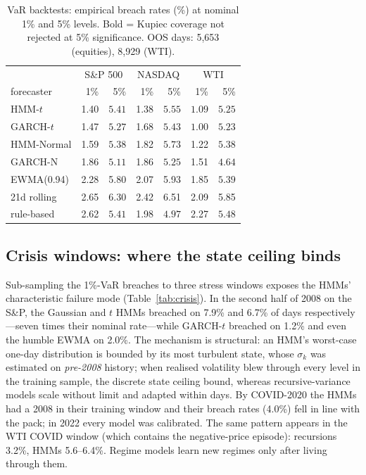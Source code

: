 \documentclass[11pt]{article}
\begin{document}
\begin{table}[t]
\centering
\caption{VaR backtests: empirical breach rates (\%) at nominal 1\% and 5\%
levels. Bold = Kupiec coverage not rejected at 5\% significance.
OOS days: 5{,}653 (equities), 8{,}929 (WTI).}
\label{tab:var}
\begin{tabular}{lrrrrrr}
\toprule
& \multicolumn{2}{c}{S\&P 500} & \multicolumn{2}{c}{NASDAQ}
& \multicolumn{2}{c}{WTI} \\
forecaster & 1\% & 5\% & 1\% & 5\% & 1\% & 5\% \\
\midrule
HMM-$t$     & 1.40 & $\mathbf{5.41}$ & 1.38 & $\mathbf{5.55}$ & $\mathbf{1.09}$ & $\mathbf{5.25}$ \\
GARCH-$t$   & 1.47 & $\mathbf{5.27}$ & 1.68 & $\mathbf{5.43}$ & $\mathbf{1.00}$ & $\mathbf{5.23}$ \\
HMM-Normal  & 1.59 & $\mathbf{5.38}$ & 1.82 & $\mathbf{5.73}$ & 1.22 & $\mathbf{5.38}$ \\
GARCH-N     & 1.86 & $\mathbf{5.11}$ & 1.86 & $\mathbf{5.25}$ & 1.51 & $\mathbf{4.64}$ \\
EWMA(0.94)  & 2.28 & 5.80 & 2.07 & 5.93 & 1.85 & $\mathbf{5.39}$ \\
21d rolling & 2.65 & 6.30 & 2.42 & 6.51 & 2.09 & 5.85 \\
rule-based  & 2.62 & $\mathbf{5.41}$ & 1.98 & $\mathbf{4.97}$ & 2.27 & $\mathbf{5.48}$ \\
\bottomrule
\end{tabular}
\end{table}

\subsection{Crisis windows: where the state ceiling binds}
Sub-sampling the 1\%-VaR breaches to three stress windows exposes the
HMMs' characteristic failure mode (Table~\ref{tab:crisis}). In the second
half of 2008 on the S\&P, the Gaussian and $t$ HMMs breached on 7.9\% and
6.7\% of days respectively---seven times their nominal rate---while
GARCH-$t$ breached on 1.2\% and even the humble EWMA on 2.0\%. The
mechanism is structural: an HMM's worst-case one-day distribution is
bounded by its most turbulent state, whose $\sigma_k$ was estimated on
\emph{pre-2008} history; when realised volatility blew through every level
in the training sample, the discrete state ceiling bound, whereas
recursive-variance models scale without limit and adapted within days. By
COVID-2020 the HMMs had a 2008 in their training window and their breach
rates (4.0\%) fell in line with the pack; in 2022 every model was
calibrated. The same pattern appears in the WTI COVID window (which
contains the negative-price episode): recursions 3.2\%, HMMs 5.6--6.4\%.
Regime models learn new regimes only after living through them.
\end{document}
